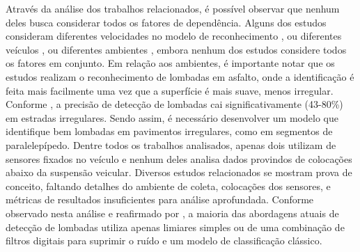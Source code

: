 Através da análise dos trabalhos relacionados, é possível observar que nenhum deles busca considerar todos os fatores de dependência. Alguns dos estudos consideram diferentes velocidades no modelo de reconhecimento  \cite{Rishiwal2016,Aljaafreh2017,Sabir2019}, ou diferentes veículos \cite{Savera2016,Idris2019,Alam2020}, ou diferentes ambientes \cite{Padilla2018}, embora nenhum dos estudos considere todos os fatores em conjunto. Em relação aos ambientes, é importante notar que os estudos realizam o reconhecimento de lombadas em asfalto, onde a identificação é feita mais facilmente uma vez que a superfície é mais suave, menos irregular. Conforme , a precisão de detecção de lombadas cai significativamente (43-80\%) em estradas irregulares. Sendo assim, é necessário desenvolver um modelo que identifique bem lombadas em pavimentos irregulares, como em segmentos de paralelepípedo. Dentre todos os trabalhos analisados, apenas dois utilizam de sensores fixados no veículo e nenhum deles analisa dados provindos de colocações abaixo da suspensão veicular. Diversos estudos relacionados se mostram prova de conceito, faltando detalhes do ambiente de coleta, colocações dos sensores, e métricas de resultados insuficientes para análise aprofundada. Conforme observado nesta análise e reafirmado por , a maioria das abordagens atuais de detecção de lombadas utiliza apenas limiares simples ou de uma combinação de filtros digitais para suprimir o ruído e um modelo de classificação clássico.
